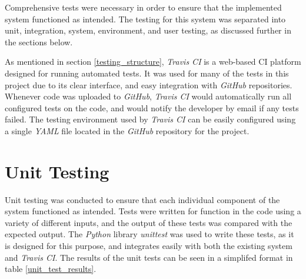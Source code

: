 %
%

Comprehensive tests were necessary in order to ensure that the implemented system functioned as intended.
The testing for this system was separated into unit, integration, system, environment, and user testing, as discussed further in the sections below.

As mentioned in section \ref{testing_structure}, \textit{Travis CI} \cite{travis_ci} is a web-based CI platform designed for running automated tests.
It was used for many of the tests in this project due to its clear interface, and easy integration with \textit{GitHub} repositories.
Whenever code was uploaded to \textit{GitHub}, \textit{Travis CI} would automatically run all configured tests on the code, and would notify the developer by email if any tests failed.
The testing environment used by \textit{Travis CI} can be easily configured using a single \textit{YAML} \cite{yaml} file located in the \textit{GitHub} repository for the project.



\section{Unit Testing}
\label{unit_testing}
Unit testing was conducted to ensure that each individual component of the system functioned as intended.
Tests were written for function in the code using a variety of different inputs, and the output of these tests was compared with the expected output.
The \textit{Python} library \textit{unittest} \cite{python_unittests} was used to write these tests, as it is designed for this purpose, and integrates easily with both the existing system and \textit{Travis CI}.
The results of the unit tests can be seen in a simplifed format in table \ref{unit_test_results}.

